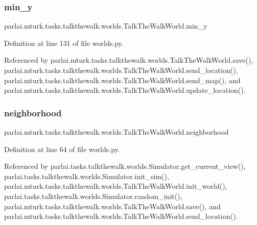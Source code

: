 \subsubsection{\texorpdfstring{min\+\_\+y}{min\_y}}
{\footnotesize\ttfamily parlai.\+mturk.\+tasks.\+talkthewalk.\+worlds.\+Talk\+The\+Walk\+World.\+min\+\_\+y}



Definition at line 131 of file worlds.\+py.



Referenced by parlai.\+mturk.\+tasks.\+talkthewalk.\+worlds.\+Talk\+The\+Walk\+World.\+save(), parlai.\+mturk.\+tasks.\+talkthewalk.\+worlds.\+Talk\+The\+Walk\+World.\+send\+\_\+location(), parlai.\+mturk.\+tasks.\+talkthewalk.\+worlds.\+Talk\+The\+Walk\+World.\+send\+\_\+map(), and parlai.\+mturk.\+tasks.\+talkthewalk.\+worlds.\+Talk\+The\+Walk\+World.\+update\+\_\+location().

\mbox{\label{classparlai_1_1mturk_1_1tasks_1_1talkthewalk_1_1worlds_1_1TalkTheWalkWorld_a8d4509c46681acc32ab5c0469eed0b39}} 
\subsubsection{\texorpdfstring{neighborhood}{neighborhood}}
{\footnotesize\ttfamily parlai.\+mturk.\+tasks.\+talkthewalk.\+worlds.\+Talk\+The\+Walk\+World.\+neighborhood}



Definition at line 64 of file worlds.\+py.



Referenced by parlai.\+tasks.\+talkthewalk.\+worlds.\+Simulator.\+get\+\_\+current\+\_\+view(), parlai.\+tasks.\+talkthewalk.\+worlds.\+Simulator.\+init\+\_\+sim(), parlai.\+mturk.\+tasks.\+talkthewalk.\+worlds.\+Talk\+The\+Walk\+World.\+init\+\_\+world(), parlai.\+tasks.\+talkthewalk.\+worlds.\+Simulator.\+random\+\_\+init(), parlai.\+mturk.\+tasks.\+talkthewalk.\+worlds.\+Talk\+The\+Walk\+World.\+save(), and parlai.\+mturk.\+tasks.\+talkthewalk.\+worlds.\+Talk\+The\+Walk\+World.\+send\+\_\+location().

